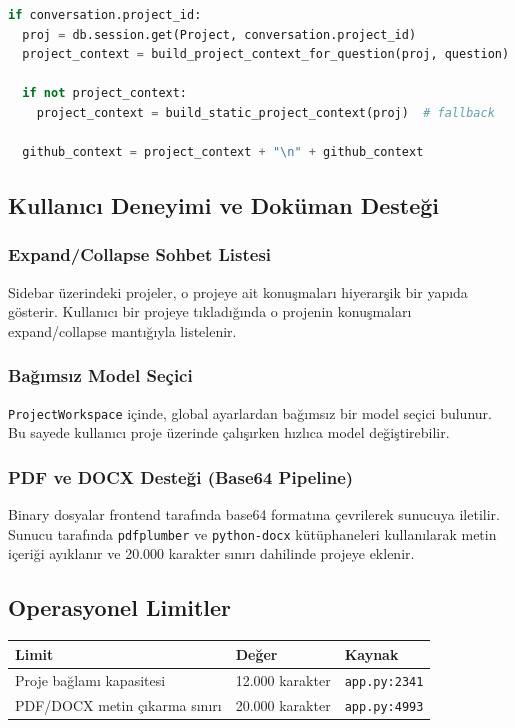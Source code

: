 \documentclass[12pt,a4paper]{article}
\begin{document}
\begin{lstlisting}[language=Python, caption={app.py — project context injection (özet akış)}]
if conversation.project_id:
  proj = db.session.get(Project, conversation.project_id)
  project_context = build_project_context_for_question(proj, question)

  if not project_context:
    project_context = build_static_project_context(proj)  # fallback

  github_context = project_context + "\n" + github_context
\end{lstlisting}

\subsection{Kullanıcı Deneyimi ve Doküman Desteği}

\subsubsection{Expand/Collapse Sohbet Listesi}
Sidebar üzerindeki projeler, o projeye ait konuşmaları hiyerarşik bir yapıda gösterir. Kullanıcı bir projeye tıkladığında o projenin konuşmaları expand/collapse mantığıyla listelenir.

\subsubsection{Bağımsız Model Seçici}
\texttt{ProjectWorkspace} içinde, global ayarlardan bağımsız bir model seçici bulunur. Bu sayede kullanıcı proje üzerinde çalışırken hızlıca model değiştirebilir.

\subsubsection{PDF ve DOCX Desteği (Base64 Pipeline)}
Binary dosyalar frontend tarafında base64 formatına çevrilerek sunucuya iletilir. Sunucu tarafında \texttt{pdfplumber} ve \texttt{python-docx} kütüphaneleri kullanılarak metin içeriği ayıklanır ve 20.000 karakter sınırı dahilinde projeye eklenir.

\subsection{Operasyonel Limitler}

\begin{tabularx}{\textwidth}{lXl}
\toprule
\textbf{Limit} & \textbf{Değer} & \textbf{Kaynak} \\
\midrule
Proje bağlamı kapasitesi & 12.000 karakter & \texttt{app.py:2341} \\
PDF/DOCX metin çıkarma sınırı & 20.000 karakter & \texttt{app.py:4993} \\
\bottomrule
\end{tabularx}
\end{document}
